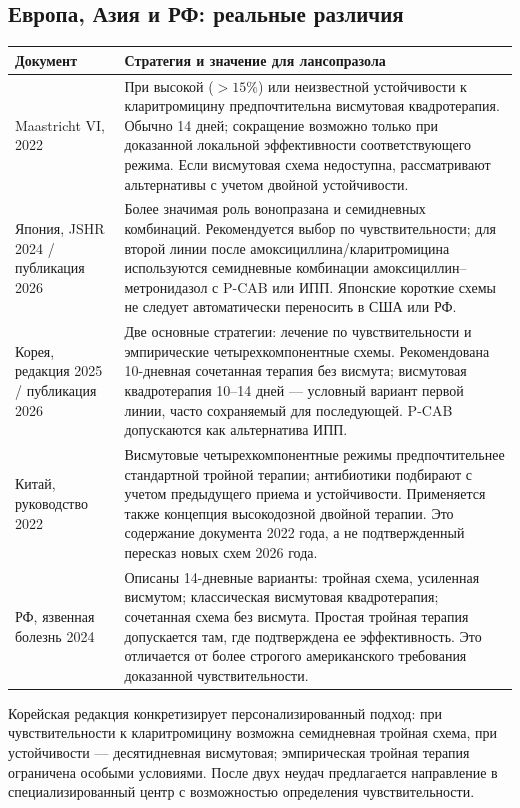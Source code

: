 \documentclass[11pt,a4paper,notitlepage]{report}
\newcommand{\src}[1]{\unskip\space\cite{#1}}
\begin{document}
\subsection{Европа, Азия и РФ: реальные различия}
\begin{longtable}{P{0.20\textwidth}P{0.73\textwidth}}
\toprule
Документ & Стратегия и значение для лансопразола \\
\midrule
\endhead
Maastricht VI, 2022 & При высокой ($>15\%$) или неизвестной устойчивости к кларитромицину предпочтительна висмутовая квадротерапия. Обычно 14 дней; сокращение возможно только при доказанной локальной эффективности соответствующего режима. Если висмутовая схема недоступна, рассматривают альтернативы с учетом двойной устойчивости.\src{maastricht} \\
Япония, JSHR 2024 / публикация 2026 & Более значимая роль вонопразана и семидневных комбинаций. Рекомендуется выбор по чувствительности; для второй линии после амоксициллина/кларитромицина используются семидневные комбинации амоксициллин--метронидазол с P-CAB или ИПП. Японские короткие схемы не следует автоматически переносить в США или РФ.\src{jhp} \\
Корея, редакция 2025 / публикация 2026 & Две основные стратегии: лечение по чувствительности и эмпирические четырехкомпонентные схемы. Рекомендована 10-дневная сочетанная терапия без висмута; висмутовая квадротерапия 10--14 дней --- условный вариант первой линии, часто сохраняемый для последующей. P-CAB допускаются как альтернатива ИПП.\src{khp} \\
Китай, руководство 2022 & Висмутовые четырехкомпонентные режимы предпочтительнее стандартной тройной терапии; антибиотики подбирают с учетом предыдущего приема и устойчивости. Применяется также концепция высокодозной двойной терапии. Это содержание документа 2022 года, а не подтвержденный пересказ новых схем 2026 года.\src{china2022,china2026} \\
РФ, язвенная болезнь 2024 & Описаны 14-дневные варианты: тройная схема, усиленная висмутом; классическая висмутовая квадротерапия; сочетанная схема без висмута. Простая тройная терапия допускается там, где подтверждена ее эффективность. Это отличается от более строгого американского требования доказанной чувствительности.\src{rfpud,acghp} \\
\bottomrule
\end{longtable}

Корейская редакция конкретизирует персонализированный подход: при чувствительности к кларитромицину возможна семидневная тройная схема, при устойчивости --- десятидневная висмутовая; эмпирическая тройная терапия ограничена особыми условиями. После двух неудач предлагается направление в специализированный центр с возможностью определения чувствительности.\src{khp}
\end{document}
